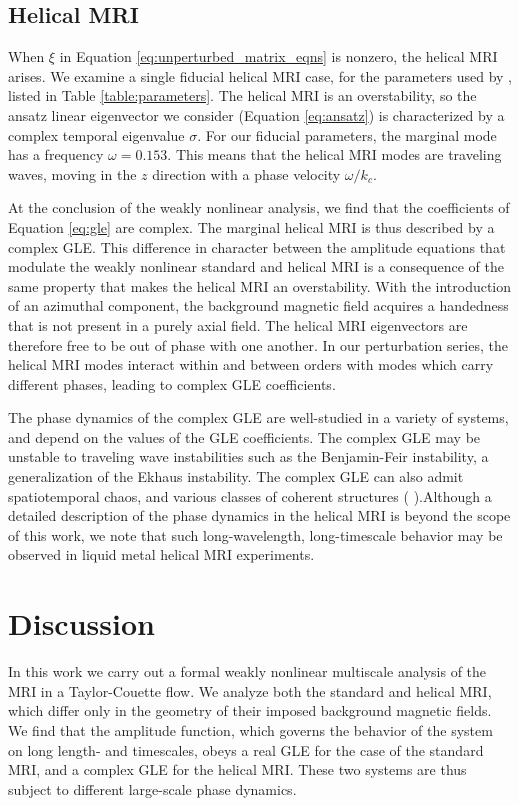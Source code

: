 \documentclass{emulateapj}
\newcommand{\citei}[1]{\citeauthor{#1} \citeyear{#1}}
\begin{document}
\subsection{Helical MRI}

When $\xi$ in Equation \ref{eq:unperturbed_matrix_eqns} is nonzero, the helical MRI arises. We examine a single fiducial helical MRI case, for the parameters used by \citet{Hollerbach:2005tr}, listed in Table \ref{table:parameters}. The helical MRI is an overstability, so the ansatz linear eigenvector we consider (Equation \ref{eq:ansatz}) is characterized by a complex temporal eigenvalue $\sigma$. For our fiducial parameters, the marginal mode has a frequency $\omega = 0.153$. This means that the helical MRI modes are traveling waves, moving in the $z$ direction with a phase velocity $\omega/k_c$.

At the conclusion of the weakly nonlinear analysis, we find that the coefficients of Equation \ref{eq:gle} are complex. The marginal helical MRI is thus described by a complex GLE. This difference in character between the amplitude equations that modulate the weakly nonlinear standard and helical MRI is a consequence of the same property that makes the helical MRI an overstability. With the introduction of an azimuthal component, the background magnetic field acquires a handedness that is not present in a purely axial field. The helical MRI eigenvectors are therefore free to be out of phase with one another. In our perturbation series, the helical MRI modes interact within and between orders with modes which carry different phases, leading to complex GLE coefficients.

The phase dynamics of the complex GLE are well-studied in a variety of systems, and depend on the values of the GLE coefficients. The complex GLE may be unstable to traveling wave instabilities such as the Benjamin-Feir instability, a generalization of the Ekhaus instability. The complex GLE can also admit spatiotemporal chaos, and various classes of coherent structures (\citei{Aranson:2002}).Although a detailed description of the phase dynamics in the helical MRI is beyond the scope of this work, we note that such long-wavelength, long-timescale behavior may be observed in liquid metal helical MRI experiments. 

\section{Discussion}
\label{sec:discussion}
In this work we carry out a formal weakly nonlinear multiscale analysis of the MRI in a Taylor-Couette flow. We analyze both the standard and helical MRI, which differ only in the geometry of their imposed background magnetic fields. We find that the amplitude function, which governs the behavior of the system on long length- and timescales, obeys a real GLE for the case of the standard MRI, and a complex GLE for the helical MRI. These two systems are thus subject to different large-scale phase dynamics. 
\end{document}
